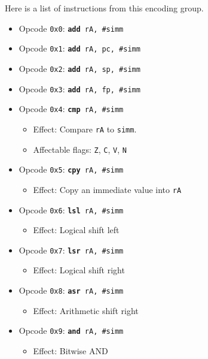 \documentclass{article}
\begin{document}
	Here is a list of instructions from this encoding group.

	\singlespacing
	\begin{itemize}
	\item Opcode \texttt{0x0}:
		\texttt{\textbf{add} rA, \#simm}
	\item Opcode \texttt{0x1}:
		\texttt{\textbf{add} rA, pc, \#simm}
	\item Opcode \texttt{0x2}:
		\texttt{\textbf{add} rA, sp, \#simm}
	\item Opcode \texttt{0x3}:
		\texttt{\textbf{add} rA, fp, \#simm}
	\item Opcode \texttt{0x4}:
		\texttt{\textbf{cmp} rA, \#simm}
		\begin{itemize}
		\item Effect: Compare \texttt{rA} to \texttt{simm}.
		\item Affectable flags:
			\texttt{Z}, \texttt{C}, \texttt{V}, \texttt{N}
		\end{itemize}
	\item Opcode \texttt{0x5}:
		\texttt{\textbf{cpy} rA, \#simm}
		\begin{itemize}
		\item Effect: Copy an immediate value into \texttt{rA}
		\end{itemize}
	\item Opcode \texttt{0x6}:
		\texttt{\textbf{lsl} rA, \#simm}
		\begin{itemize}
		\item Effect: Logical shift left
		\end{itemize}
	\item Opcode \texttt{0x7}:
		\texttt{\textbf{lsr} rA, \#simm}
		\begin{itemize}
		\item Effect: Logical shift right
		\end{itemize}
	\item Opcode \texttt{0x8}:
		\texttt{\textbf{asr} rA, \#simm}
		\begin{itemize}
		\item Effect: Arithmetic shift right
		\end{itemize}
	\item Opcode \texttt{0x9}:
		\texttt{\textbf{and} rA, \#simm}
		\begin{itemize}
		\item Effect: Bitwise AND

\end{itemize}
\end{itemize}
\end{document}
